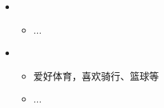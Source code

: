 \resheading{{\color{white}{ 个人陈述}} }
  \begin{itemize}[leftmargin=*]
    \item
      {\small
      \begin{itemize}
        \item ...
      \end{itemize}
      }


    \item
      {\small
      \begin{itemize}
        \item 爱好体育，喜欢骑行、篮球等
        \item ...
      \end{itemize}
      }  \end{itemize}
